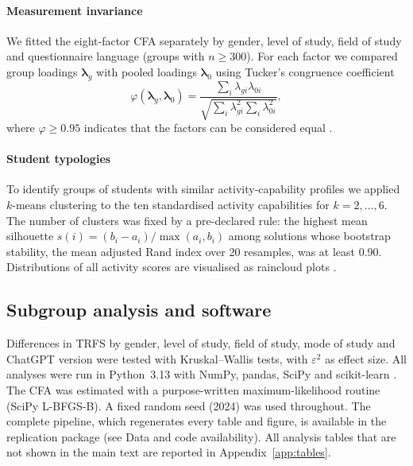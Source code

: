 \documentclass[fleqn,10pt]{wlscirep}
\theoremstyle{remark}
\begin{document}
\paragraph{Measurement invariance} We fitted the eight-factor CFA separately by gender, level of study, field of study and questionnaire language (groups with $n\ge300$). For each factor we compared group loadings $\boldsymbol\lambda_g$ with pooled loadings $\boldsymbol\lambda_0$ using Tucker's congruence coefficient
\begin{equation}
\varphi(\boldsymbol\lambda_g,\boldsymbol\lambda_0)=\frac{\sum_i\lambda_{gi}\lambda_{0i}}{\sqrt{\sum_i\lambda_{gi}^2\sum_i\lambda_{0i}^2}},
\label{eq:tucker}
\end{equation}
where $\varphi\ge0.95$ indicates that the factors can be considered equal \cite{lorenzo2006}.

\paragraph{Student typologies} To identify groups of students with similar activity-capability profiles we applied $k$-means clustering \cite{lloyd1982} to the ten standardised activity capabilities for $k=2,\dots,6$. The number of clusters was fixed by a pre-declared rule: the highest mean silhouette $s(i)=(b_i-a_i)/\max(a_i,b_i)$ \cite{rousseeuw1987} among solutions whose bootstrap stability, the mean adjusted Rand index \cite{hubert1985} over 20 resamples, was at least 0.90. Distributions of all activity scores are visualised as raincloud plots \cite{allen2019}.

\subsection{Subgroup analysis and software}
Differences in TRFS by gender, level of study, field of study, mode of study and ChatGPT version were tested with Kruskal--Wallis tests, with $\varepsilon^2$ as effect size. All analyses were run in Python~3.13 with NumPy, pandas, SciPy and scikit-learn \cite{pedregosa2011}. The CFA was estimated with a purpose-written maximum-likelihood routine (SciPy L-BFGS-B). A fixed random seed (2024) was used throughout. The complete pipeline, which regenerates every table and figure, is available in the replication package (see Data and code availability). All analysis tables that are not shown in the main text are reported in Appendix~\ref{app:tables}.

\end{document}

